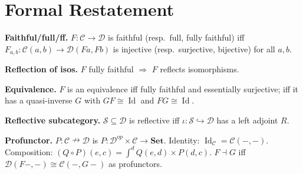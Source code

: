 \section{Formal Restatement}

\begin{formalrestatement}
\textbf{Faithful/full/ff.}
$F : \mathcal{C} \to \mathcal{D}$ is faithful (resp.\ full, fully faithful) iff
$F_{a,b} : \mathcal{C}(a,b) \to \mathcal{D}(Fa,Fb)$ is injective (resp.\ surjective,
bijective) for all $a,b$.

\textbf{Reflection of isos.} $F$ fully faithful $\Rightarrow$ $F$ reflects
isomorphisms.

\textbf{Equivalence.} $F$ is an equivalence iff fully faithful and essentially
surjective; iff it has a quasi-inverse $G$ with $GF \cong \operatorname{Id}$ and
$FG \cong \operatorname{Id}$.

\textbf{Reflective subcategory.}
$\mathcal{S} \subseteq \mathcal{D}$ is reflective iff $\iota : \mathcal{S} \hookrightarrow
\mathcal{D}$ has a left adjoint $R$.

\textbf{Profunctor.}
$P : \mathcal{C} \nrightarrow \mathcal{D}$ is $P : \mathcal{D}^{op} \times \mathcal{C} \to \mathbf{Set}$.
Identity: $\operatorname{Id}_\mathcal{C} = \mathcal{C}(-,-)$.
Composition: $(Q \circ P)(e,c) = \int^d Q(e,d) \times P(d,c)$.
$F \dashv G$ iff $\mathcal{D}(F-,-) \cong \mathcal{C}(-,G-)$ as profunctors.
\end{formalrestatement}
